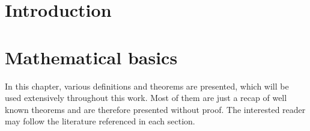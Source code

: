 \documentclass[12pt,a4paper,twoside, open=right]{scrreprt}
\theoremstyle{definition}
\theoremstyle{plain}
\begin{document}
\chapter{Introduction}
\lipsum[1]
\newpage
\chapter{Mathematical basics}
In this chapter, various definitions and theorems are presented, which will be used extensively throughout this work. Most of them are just a recap of well known theorems and are therefore presented without proof. The interested reader may follow the literature referenced in each section.
\end{document}
